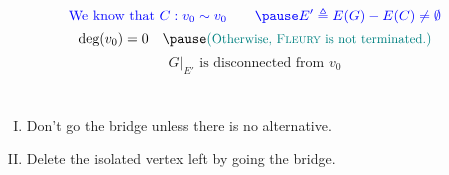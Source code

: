 \begin{frame}{}
  \begin{columns}
      \begin{center}
	 \\[6pt]
      \end{center}
  \end{columns}

  \pause
  \vspace{0.30cm}
  \[
    \blue{\text{We know that } C: v_0 \sim v_0 \qquad \pause E' \triangleq E(G) - E(C) \neq \emptyset}
  \]
  \pause
  \[
    \text{deg}(v_0) = 0 \quad \pause \teal{(\text{\small Otherwise, \textsc{Fleury} is not terminated.})}
  \]
  \pause
  \[
    G|_{E'} \text{ is disconnected from } v_0
  \]
  \pause
  \begin{center}
  \end{center}

  \pause
  \begin{columns}
      \begin{enumerate}[(I)]
	\item Don't go the bridge unless there is no alternative.
	\item Delete the isolated vertex left by going the bridge.
      \end{enumerate}
  \end{columns}
\end{frame}
